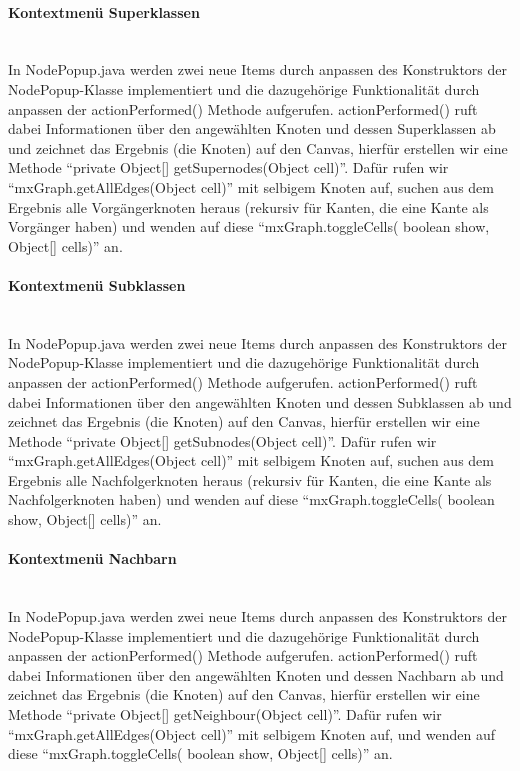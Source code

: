 \documentclass[10pt,a4paper]{article}
\begin{document}
\paragraph{Kontextmenü Superklassen}\ \\ 

In NodePopup.java werden zwei neue Items durch anpassen des Konstruktors der NodePopup-Klasse implementiert und die dazugehörige Funktionalität durch anpassen der actionPerformed() Methode aufgerufen. actionPerformed() ruft dabei Informationen über den angewählten Knoten und dessen Superklassen ab und zeichnet das Ergebnis (die Knoten) auf den Canvas, hierfür erstellen wir eine Methode "`private Object[] getSupernodes(Object cell)"'. Dafür rufen wir "`mxGraph.getAllEdges(Object cell)"' mit selbigem Knoten auf, suchen aus dem Ergebnis alle Vorgängerknoten heraus (rekursiv für Kanten, die eine Kante als Vorgänger haben) und wenden auf diese "`mxGraph.toggleCells( boolean show, Object[] cells)"' an.

\paragraph{Kontextmenü Subklassen}\ \\ 

In NodePopup.java werden zwei neue Items durch anpassen des Konstruktors der NodePopup-Klasse implementiert und die dazugehörige Funktionalität durch anpassen der actionPerformed() Methode aufgerufen. actionPerformed() ruft dabei Informationen über den angewählten Knoten und dessen Subklassen ab und zeichnet das Ergebnis (die Knoten) auf den Canvas, hierfür erstellen wir eine Methode "`private Object[] getSubnodes(Object cell)"'. Dafür rufen wir "`mxGraph.getAllEdges(Object cell)"' mit selbigem Knoten auf, suchen aus dem Ergebnis alle Nachfolgerknoten heraus (rekursiv für Kanten, die eine Kante als Nachfolgerknoten haben) und wenden auf diese "`mxGraph.toggleCells( boolean show, Object[] cells)"' an.

\paragraph{Kontextmenü Nachbarn}\ \\ 

In NodePopup.java werden zwei neue Items durch anpassen des Konstruktors der NodePopup-Klasse implementiert und die dazugehörige Funktionalität durch anpassen der actionPerformed() Methode aufgerufen. actionPerformed() ruft dabei Informationen über den angewählten Knoten und dessen Nachbarn ab und zeichnet das Ergebnis (die Knoten) auf den Canvas, hierfür erstellen wir eine Methode "`private Object[] getNeighbour(Object cell)"'. Dafür rufen wir "`mxGraph.getAllEdges(Object cell)"' mit selbigem Knoten auf, und wenden auf diese "`mxGraph.toggleCells( boolean show, Object[] cells)"' an.
\end{document}
